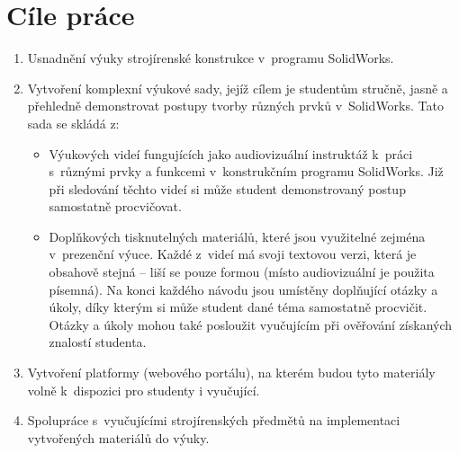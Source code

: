 \chapter{Cíle práce}

\begin{enumerate}[topsep=0pt]
    \setlength\itemsep{0em}
    \item Usnadnění výuky strojírenské konstrukce v~programu SolidWorks.
    \item Vytvoření komplexní výukové sady, jejíž cílem je studentům stručně, jasně a přehledně demonstrovat postupy tvorby různých prvků v~SolidWorks. Tato sada se skládá z:
    \begin{itemize}[topsep=0pt]
        \setlength\itemsep{0em}
        \item Výukových videí fungujících jako audiovizuální instruktáž k~práci s~různými prvky a funkcemi v~konstrukčním programu SolidWorks. Již při sledování těchto videí si může student demonstrovaný postup samostatně procvičovat. 
        \item Doplňkových tisknutelných materiálů, které jsou využitelné zejména v~prezenční výuce. Každé z~videí má svoji textovou verzi, která je obsahově stejná -- liší se pouze formou (místo audiovizuální je použita písemná). Na konci každého návodu jsou umístěny doplňující otázky a úkoly, díky kterým si může student dané téma samostatně procvičit. Otázky a úkoly mohou také posloužit vyučujícím při ověřování získaných znalostí studenta. 
    \end{itemize}
    \item Vytvoření platformy (webového portálu), na kterém budou tyto materiály volně k~dispozici pro studenty i vyučující.
    \item Spolupráce s~vyučujícími strojírenských předmětů na implementaci vytvořených materiálů do výuky.
\end{enumerate}
